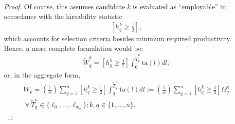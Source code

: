 \documentclass[hidelinks, nonatbib]{elsarticle}
\begin{document}
\begin{corollary}
\begin{proof}
        Of course, this assumes candidate $k$ is evaluated as ``employable'' in accordance with the hireability statistic
        \begin{gather}
            \left[
                h_{q}^{k}
                \geq
                \frac{1}{2}
            \right]
            ,
        \end{gather}
        which accounts for selection criteria besides minimum required productivity. Hence, a more complete formulation would be:
        \begin{gather}
            \tilde{W}_{q}^{k}
            =
            \left[
                h_{q}^{k}
                \geq
                \frac{1}{2}
            \right]
            \int_{0}^{\tilde{T}_{q}^{\kappa}}
            \text{ta}(l)
            dl
            ;
        \end{gather}
        or, in the aggregate form,
        \begin{gather}
            \tilde{W}_k 
            = 
            \left(
                \frac{1}{w}
            \right)
            \sum_{q=1}^{n}
            \left[
                h_{q}^{k}
                \geq
                \frac{1}{2}
            \right]
            \int_{0}^{\tilde{T}_{q}^{\kappa}}
            \text{ta}(l)
            dl
            :=
            \left(
                \frac{1}{w}
            \right)
            \sum_{q=1}^{n}
            \left[
                h_{q}^{k}
                \geq
                \frac{1}{2}
            \right]
            \Omega_{q}^{\kappa}
            \\
            \
            \forall
            \
            \tilde{T}_{q}^{\kappa} \in \{
                \ell_{0}, 
                \dots, 
                \ell_{w_q}
            \}
            ;
            k,q \in \{1, \dots, n\}
            .
        \end{gather}
    \end{proof}        
\end{corollary}

\end{document}
